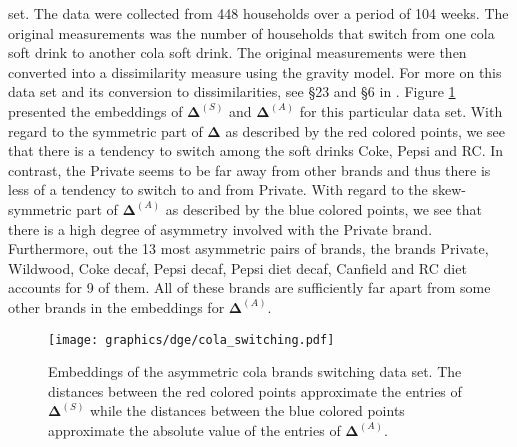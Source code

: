 \documentclass[11pt]{asaproc}
\begin{document}
set. The data were collected from 448 households over a period of 104
weeks. The original measurements was the number of households that
switch from one cola soft drink to another cola soft drink. The
original measurements were then converted into a dissimilarity measure
using the gravity model. For more on this data set and its conversion
to dissimilarities, see \S 23 and \S 6 in
\citet{borg05:_moder}. Figure \ref{fig:colaswitch} presented the
embeddings of $\bm{\Delta}^{(S)}$ and $\bm{\Delta}^{(A)}$ for this
particular data set. With regard to the symmetric part of
$\bm{\Delta}$ as described by the red colored points, we see that
there is a tendency to switch among the soft drinks Coke, Pepsi and
RC. In contrast, the Private seems to be far away from other brands
and thus there is less of a tendency to switch to and from
Private. With regard to the skew-symmetric part of $\bm{\Delta}^{(A)}$
as described by the blue colored points, we see that there is a high
degree of asymmetry involved with the Private brand. Furthermore, out
the 13 most asymmetric pairs of brands, the brands Private, Wildwood,
Coke decaf, Pepsi decaf, Pepsi diet decaf, Canfield and RC diet
accounts for 9 of them. All of these brands are sufficiently far apart
from some other brands in the embeddings for $\bm{\Delta}^{(A)}$. 
\begin{figure}[htbp]
  \centering
    \texttt{[image: graphics/dge/cola\_switching.pdf]}
    \caption{Embeddings of the asymmetric cola brands switching
      data set. The distances between the red colored points
      approximate the entries of $\bm{\Delta}^{(S)}$ while the
      distances between the blue colored points approximate the
      absolute value of the entries of $\bm{\Delta}^{(A)}$.}
  \label{fig:colaswitch}
\end{figure}
\end{document}
